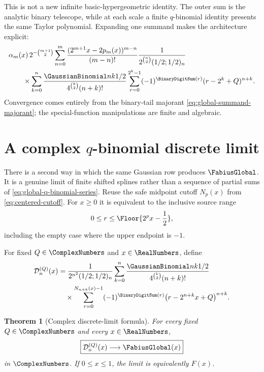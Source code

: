 \documentclass[11pt,oneside]{article}
\newtheorem{theorem}{Theorem}[section]
\theoremstyle{definition}
\theoremstyle{remark}
\begin{document}
This is not a new infinite basic-hypergeometric identity.  The outer sum is the analytic
binary telescope, while at each scale a finite $q$-binomial identity presents the same
Taylor polynomial.  Expanding one summand makes the architecture explicit:
\begin{align}
 &\alpha_m(x)\,2^{-\binom{m+1}{2}}
 \sum_{n=0}^{m}
 \frac{(2^{m+1}x-2p_m(x))^{m-n}}{(m-n)!}
 \frac1{2^{\binom n2}(1/2;1/2)_n}                       \notag\\
 &\qquad\times
 \sum_{k=0}^{n}
 \frac{\GaussianBinomial nk{1/2}}{4^{\binom k2}(n+k)!}
 \sum_{r=0}^{2^k-1}(-1)^{\BinaryDigitSum(r)}
 (r-2^k+Q)^{n+k}.                                       \label{eq:global-q-literal-summand}
\end{align}
Convergence comes entirely from the binary-tail majorant
\eqref{eq:global-summand-majorant}; the special-function manipulations are finite and
algebraic.

\section{A complex \texorpdfstring{$q$}{q}-binomial discrete limit}
\label{sec:q-discrete-limit}

There is a second way in which the same Gaussian row produces $\FabiusGlobal$.  It is a genuine
limit of finite shifted splines rather than a sequence of partial sums of
\eqref{eq:global-q-binomial-series}.  Reuse the safe midpoint cutoff $N_p(x)$ from
\eqref{eq:centered-cutoff}.  For $x\ge0$ it is equivalent to the inclusive source range
\begin{equation}
 0\le r\le\Floor{2^px-\frac12},                           \label{eq:discrete-cutoff-inclusive}
\end{equation}
including the empty case where the upper endpoint is $-1$.

For fixed $Q\in\ComplexNumbers$ and $x\in\RealNumbers$, define
\begin{align}
 \mathcal D_n^{(Q)}(x)
 &=
 \frac1{2^{n^2}(1/2;1/2)_n}
 \sum_{k=0}^{n}
 \frac{\GaussianBinomial nk{1/2}}{4^{\binom k2}(n+k)!}             \notag\\
 &\quad\times
 \sum_{r=0}^{N_{n+k}(x)-1}(-1)^{\BinaryDigitSum(r)}
 \bigl(r-2^{n+k}x+Q\bigr)^{n+k}.                         \label{eq:discrete-q-approximant}
\end{align}

\begin{theorem}[Complex discrete-limit formula]
For every fixed $Q\in\ComplexNumbers$ and every $x\in\RealNumbers$,
\begin{equation}
 \boxed{\mathcal D_n^{(Q)}(x)\longrightarrow\FabiusGlobal(x)}
                                                               \label{eq:discrete-q-limit}
\end{equation}
in $\ComplexNumbers$.  If $0\le x\le1$, the limit is equivalently $F(x)$.
\end{theorem}
\end{document}
